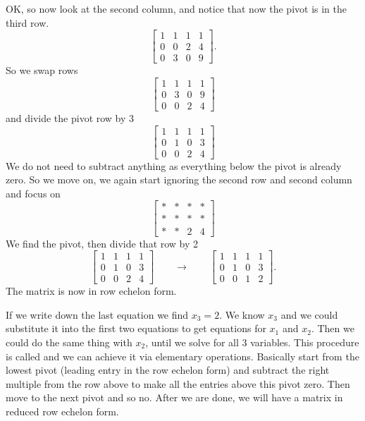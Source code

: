 OK, so now look at the second column, and notice that now the pivot is in the
third row.
\begin{equation*}
\left[
\begin{array}{ccc|c}
1 & 1 & 1 & 1 \\
0 & 0 & 2 & 4 \\
0 & \boxed{3} & 0 & 9
\end{array}
\right] .
\end{equation*}
So we swap rows
\begin{equation*}
\left[
\begin{array}{ccc|c}
1 & 1 & 1 & 1 \\
0 & \boxed{3} & 0 & 9 \\
0 & 0 & 2 & 4
\end{array}
\right] 
\end{equation*}
and divide the pivot row by 3
\begin{equation*}
\left[
\begin{array}{ccc|c}
1 & 1 & 1 & 1 \\
0 & \boxed{1} & 0 & 3 \\
0 & 0 & 2 & 4
\end{array}
\right] 
\end{equation*}
We do not need to subtract anything as everything below the pivot is already
zero.  So we move on, we again start ignoring the second row and second
column and focus on 
\begin{equation*}
\left[
\begin{array}{ccc|c}
* & * & * & * \\
* & * & * & * \\
* & * & 2 & 4
\end{array}
\right] 
\end{equation*}
We find the pivot, then divide that row by 2
\begin{equation*}
\left[
\begin{array}{ccc|c}
1 & 1 & 1 & 1 \\
0 & 1 & 0 & 3 \\
0 & 0 & \boxed{2} & 4
\end{array}
\right] 
\qquad \to \qquad
\left[
\begin{array}{ccc|c}
1 & 1 & 1 & 1 \\
0 & 1 & 0 & 3 \\
0 & 0 & 1 & 2
\end{array}
\right] .
\end{equation*}
The matrix is now in row echelon form.

If we write down the last equation we find $x_3 = 2$.  We know $x_3$ and we
could substitute it into the first two equations to get equations for
$x_1$ and $x_2$.  Then we could do the same thing with $x_2$, until we solve
for all 3 variables.  This procedure is called
\emph{} and we can achieve it via elementary
operations.
Basically start from the lowest pivot (leading entry in the row
echelon form) and subtract the right multiple from the row above to
make all the entries above this pivot zero.  Then move to the next pivot and
so no.
After we are done, we will have a matrix in reduced row echelon form.

